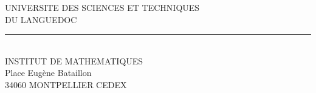
\begin{center}
UNIVERSITE DES SCIENCES ET TECHNIQUES\\
DU LANGUEDOC\\
\rule{1cm}{0.2pt}\\
INSTITUT DE MATHEMATIQUES\\
Place Eugène Bataillon\\
34060 MONTPELLIER CEDEX
\end{center}

